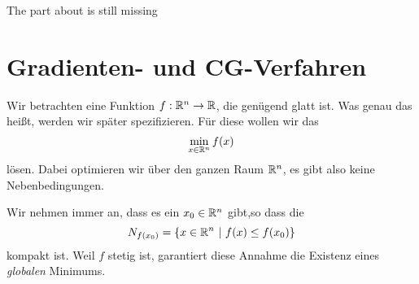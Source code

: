 \coms The part about  is still missing\come

\chapter{Gradienten- und CG-Verfahren}

Wir betrachten eine Funktion $f:\mathbb{R}^n\to \mathbb{R}$, die genügend glatt ist. Was genau das heißt, werden wir später spezifizieren. Für diese wollen wir das 
\[
\min_{x\in \mathbb{R}^n}f(x)
\]
lösen. Dabei optimieren wir über den ganzen Raum $\mathbb{R}^n$, es gibt also keine Nebenbedingungen.\par 
Wir nehmen immer an, dass es ein $x_0\in\mathbb{R}^n$ gibt,so dass die 
\[
N_{f(x_0)} = \{x\in \mathbb{R}^n~|~ f(x)\leq f(x_0)\}
\]
kompakt ist. Weil $f$ stetig ist, garantiert diese Annahme die Existenz eines \textit{globalen} Minimums.
\lec